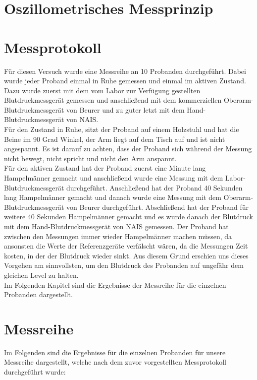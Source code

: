 \documentclass[a4paper, 11pt]{scrartcl}
\begin{document}
\newpage
\section*{Oszillometrisches Messprinzip}

\newpage

\section*{Messprotokoll}
Für diesen Versuch wurde eine Messreihe an 10 Probanden durchgeführt.
Dabei wurde jeder Proband einmal in Ruhe gemessen und einmal im aktiven Zustand.
Dazu wurde zuerst mit dem vom Labor zur Verfügung gestellten Blutdruckmessgerät gemessen und anschließend mit dem kommerziellen Oberarm- Blutdruckmessgerät von Beurer und zu guter letzt mit dem Hand-Blutdruckmessgerät von NAIS.\\

Für den Zustand in Ruhe, sitzt der Proband auf einem Holzstuhl und hat die Beine im 90 Grad Winkel, der Arm liegt auf dem Tisch auf und ist nicht angespannt. Es ist darauf zu achten, dass der Proband sich während der Messung nicht bewegt, nicht spricht und nicht den Arm anspannt.\\

Für den aktiven Zustand hat der Proband zuerst eine Minute lang Hampelmänner gemacht und anschließend wurde eine Messung mit dem Labor-Blutdruckmessgerät durchgeführt. Anschließend hat der Proband 40 Sekunden lang Hampelmänner gemacht und danach wurde eine Messung mit dem 
Oberarm- Blutdruckmessgerät von Beurer durchgeführt. Abschließend hat der Proband für weitere 40 Sekunden Hampelmänner gemacht und es wurde danach der Blutdruck mit dem Hand-Blutdruckmessgerät von NAIS gemessen.
Der Proband hat zwischen den Messungen immer wieder Hampelmänner machen müssen, da ansonsten die Werte der Referenzgeräte verfälscht wären, da die Messungen Zeit kosten, in der der Blutdruck wieder sinkt. Aus diesem Grund erschien uns dieses Vorgehen am sinnvollsten, um den Blutdruck des Probanden auf ungefähr dem gleichen Level zu halten.\\
Im Folgenden Kapitel sind die Ergebnisse der Messreihe für die einzelnen Probanden dargestellt.

\newpage

\section*{Messreihe}
Im Folgenden sind die Ergebnisse für die einzelnen Probanden für unsere Messreihe dargestellt, welche nach dem zuvor vorgestellten Messprotokoll durchgeführt wurde: \\
\end{document}
